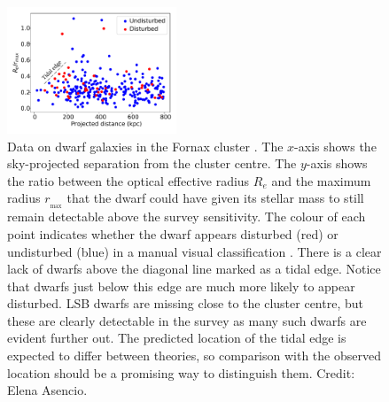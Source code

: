 \documentclass[fleqn,usenatbib,useAMS,onecolumn]{mnras} %
\begin{document}
\begin{figure}
	\centering
	\includegraphics[width=0.45\textwidth]{Fornax_tidal_edge}
	\caption{Data on dwarf galaxies in the Fornax cluster \citep{Venhola_2018}. The $x$-axis shows the sky-projected separation from the cluster centre. The $y$-axis shows the ratio between the optical effective radius $R_e$ and the maximum radius $r_{_{\text{max}}}$ that the dwarf could have given its stellar mass to still remain detectable above the survey sensitivity. The colour of each point indicates whether the dwarf appears disturbed (red) or undisturbed (blue) in a manual visual classification \citep{Venhola_2022}. There is a clear lack of dwarfs above the diagonal line marked as a tidal edge. Notice that dwarfs just below this edge are much more likely to appear disturbed. LSB dwarfs are missing close to the cluster centre, but these are clearly detectable in the survey as many such dwarfs are evident further out. The predicted location of the tidal edge is expected to differ between theories, so comparison with the observed location should be a promising way to distinguish them. Credit: Elena Asencio.}
	\label{Fornax_tidal_edge}
\end{figure}
\end{document}
